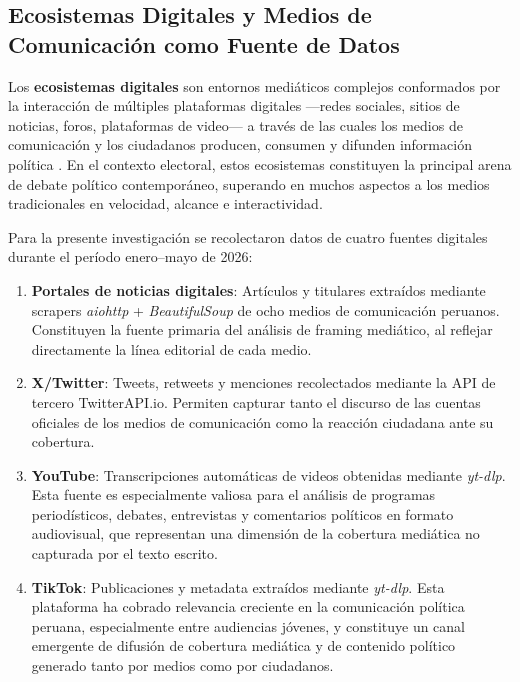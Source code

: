 \subsection{Ecosistemas Digitales y Medios de Comunicación como Fuente de Datos}

Los \textbf{ecosistemas digitales} son entornos mediáticos complejos conformados por la interacción de múltiples plataformas digitales —redes sociales, sitios de noticias, foros, plataformas de video— a través de las cuales los medios de comunicación y los ciudadanos producen, consumen y difunden información política \parencite{mc_chadwick2013hybrid}. En el contexto electoral, estos ecosistemas constituyen la principal arena de debate político contemporáneo, superando en muchos aspectos a los medios tradicionales en velocidad, alcance e interactividad.

Para la presente investigación se recolectaron datos de cuatro fuentes digitales durante el período enero–mayo de 2026:

\begin{enumerate}
    \item \textbf{Portales de noticias digitales}: Artículos y titulares extraídos mediante scrapers \textit{aiohttp} + \textit{BeautifulSoup} de ocho medios de comunicación peruanos. Constituyen la fuente primaria del análisis de framing mediático, al reflejar directamente la línea editorial de cada medio.

    \item \textbf{X/Twitter}: Tweets, retweets y menciones recolectados mediante la API de tercero TwitterAPI.io. Permiten capturar tanto el discurso de las cuentas oficiales de los medios de comunicación como la reacción ciudadana ante su cobertura.

    \item \textbf{YouTube}: Transcripciones automáticas de videos obtenidas mediante \textit{yt-dlp}. Esta fuente es especialmente valiosa para el análisis de programas periodísticos, debates, entrevistas y comentarios políticos en formato audiovisual, que representan una dimensión de la cobertura mediática no capturada por el texto escrito.

    \item \textbf{TikTok}: Publicaciones y metadata extraídos mediante \textit{yt-dlp}. Esta plataforma ha cobrado relevancia creciente en la comunicación política peruana, especialmente entre audiencias jóvenes, y constituye un canal emergente de difusión de cobertura mediática y de contenido político generado tanto por medios como por ciudadanos.
\end{enumerate}

